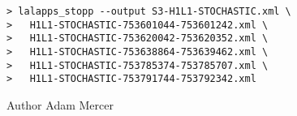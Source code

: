 \begin{entry}
\begin{verbatim}
> lalapps_stopp --output S3-H1L1-STOCHASTIC.xml \
>   H1L1-STOCHASTIC-753601044-753601242.xml \
>   H1L1-STOCHASTIC-753620042-753620352.xml \
>   H1L1-STOCHASTIC-753638864-753639462.xml \
>   H1L1-STOCHASTIC-753785374-753785707.xml \
>   H1L1-STOCHASTIC-753791744-753792342.xml
\end{verbatim}

\item[Author]
Adam Mercer
\end{entry}
